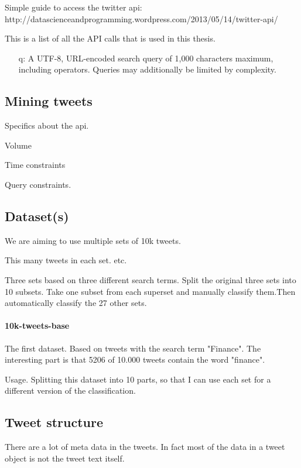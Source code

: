 Simple guide to access the twitter api:  http://datascienceandprogramming.wordpress.com/2013/05/14/twitter-api/

This is a list of all the API calls that is used in this thesis. 
\begin{itemize}
\item[q:] A UTF-8, URL-encoded search query of 1,000 characters maximum, including
operators. Queries may additionally be limited by complexity.

\end{itemize}

\subsection{Mining tweets} %

Specifics about the api. 

Volume

Time constraints 

Query constraints. 

\subsection{Dataset(s)}
We are aiming to use multiple sets of 10k tweets. 

This many tweets in each set. etc. 

Three sets based on three different search terms.
Split the original three sets into 10 subsets. 
Take one subset from each superset and manually classify them.Then
automatically classify the 27 other sets.  

\paragraph{10k-tweets-base}
The first dataset.
Based on tweets with the search term "Finance". 
The interesting part is that 5206 of 10.000 tweets contain the word "finance".

Usage. Splitting this dataset into 10 parts, so that I can use each set for a
different version of the classification. 

\subsection{Tweet structure}
There are a lot of meta data in the tweets. In fact most of the data in a tweet
object is not the tweet text itself.  


